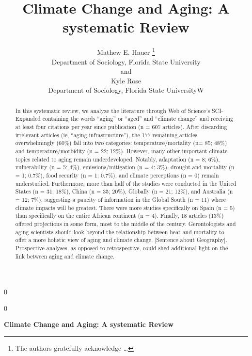 \documentclass[12pt]{article}
\newcommand{\blind}{0}
\begin{document}
\def\spacingset#1{\renewcommand{\baselinestretch}%
{#1}\small\normalsize} \spacingset{1}



\blind
{
  \title{\bf Climate Change and Aging: A systematic Review}

  \author{
        Mathew E. Hauer \thanks{The authors gratefully acknowledge
\ldots{}} \\
    Department of Sociology, Florida State University\\
     and \\     Kyle Rose \\
    Department of Sociology, Florida State UniversityW\\
      }
  \maketitle
} \fi

\blind
{
  \bigskip
  \bigskip
  \bigskip
  \begin{center}
    {\LARGE\bf Climate Change and Aging: A systematic Review}
  \end{center}
  \medskip
} \fi

\bigskip
\begin{abstract}
In this systematic review, we analyze the literature through Web of
Science's SCI-Expanded containing the words ``aging'' or ``aged'' and
``climate change'' and receiving at least four citations per year since
publication (n = 607 articles). After discarding irrelevant articles
(ie, ``aging infrastructure''), the 177 remaining articles
overwhelmingly (60\%) fall into two categories: temperature/mortality
(n= 85; 48\%) and temperature/morbidity (n = 22; 12\%). However, many
other important climate topics related to aging remain underdeveloped.
Notably, adaptation (n = 8; 6\%), vulnerability (n = 5; 4\%),
emissions/mitigation (n = 4; 3\%), drought and mortality (n = 1; 0.7\%),
food security (n = 1; 0.7\%), and climate perceptions (n = 0) remain
understudied. Furthermore, more than half of the studies were conducted
in the United States (n = 31; 18\%), China (n = 35; 20\%), Globally (n =
21; 12\%), and Australia (n = 12; 7\%), suggesting a paucity of
information in the Global South (n = 11) where climate impacts will be
greatest. There were more studies specifically on Spain (n = 5) than
specifically on the entire African continent (n = 4). Finally, 18
articles (13\%) offered projections in some form, most to the middle of
the century. Gerontologists and aging scientists should look beyond the
relationship between heat and mortality to offer a more holistic view of
aging and climate change. {[}Sentence about Geography{]}. Prospective
analyses, as opposed to retrospective, could shed additional light on
the link between aging and climate change.
\end{abstract}
\end{document}
